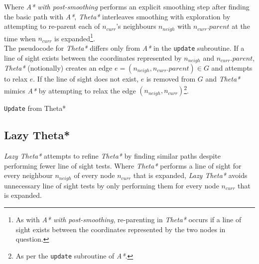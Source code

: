 \documentclass[12pt,notitlepage]{report}
\begin{document}
Where {\em A* with post-smoothing} performs an explicit smoothing step after finding the basic path with {\em A*}, {\em Theta*} interleaves smoothing with exploration by attempting to re-parent each of $n_{curr}$'s neighbours $n_{neigh}$ with $n_{curr}.parent$ at the time when $n_{curr}$ is expanded\footnote{As with {\em A* with post-smoothing}, re-parenting in {\em Theta*} occurs if a line of sight exists between the coordinates represented by the two nodes in question.}.\\

\noindent
The pseudocode for {\em Theta*} differs only from {\em A*} in the {\tt update} subroutine. If a line of sight exists between the coordinates represented by $n_{neigh}$ and $n_{curr}.parent$, {\em Theta*} (notionally) creates an edge $e = (n_{neigh}, n_{curr}.parent)  \in G$ and attempts to relax $e$. If the line of sight does not exist, $e$ is removed from $G$ and {\em Theta*} mimics {\em A*} by attempting to relax the edge $(n_{neigh},n_{curr})$\footnote{As per the {\tt update} subroutine of {\em A*}.}.

\begin{algorithm}
  \SetAlgoLined\DontPrintSemicolon
  \caption{{\tt Update} from {\sc Theta*}}
\end{algorithm} 

\subsection {Lazy Theta*}

{\em Lazy Theta*} attempts to refine {\em Theta*} by finding similar paths despite performing fewer line of sight tests. Where {\em Theta*} performs a line of sight for every neighbour $n_{neigh}$ of every node $n_{curr}$ that is expanded, {\em Lazy Theta*} avoids unnecessary line of sight tests by only performing them for every node $n_{curr}$ that is expanded. \\
\end{document}
